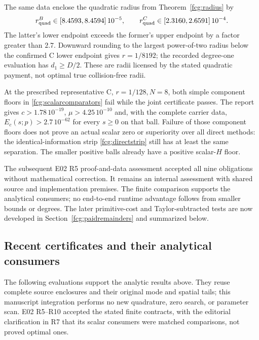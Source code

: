 \documentclass[11pt]{article}
\numberwithin{equation}{section}
\begin{document}
The same data enclose the quadratic radius from
Theorem~\ref{fcg:radius} by
\[
 r_{\rm quad}^{B}\in[8.4593,8.4594]\,10^{-5},\qquad
 r_{\rm quad}^{C}\in[2.3160,2.6591]\,10^{-4}.
\]
The latter's lower endpoint exceeds the former's upper endpoint by
a factor greater than $2.7$. Downward rounding to the largest
power-of-two radius below the confirmed C lower endpoint gives
$r=1/8192$; the recorded degree-one evaluation has $d_1\ge D/2$.
These are radii licensed by the stated quadratic payment, not optimal
true collision-free radii.

At the prescribed representative C, $r=1/128,N=8$, both simple
component floors in \eqref{fcg:scalarcomparators} fail while the joint
certificate passes. The report gives $c>1.78\,10^{-19}$,
$\mu>4.25\,10^{-10}$ and, with the complete carrier data,
$E_c(s;p)>2.7\,10^{-62}$ for every $s\ge0$ on that ball.
Failure of those component floors does not prove an actual scalar
zero or superiority over all direct methods: the identical-information
strip \eqref{fcg:directstrip} still has at least the same separation.
The smaller positive balls already have a positive scalar-$H$ floor.

The subsequent E02 R5 proof-and-data assessment accepted all nine
obligations without mathematical correction. It remains an internal
assessment with shared source and implementation premises. The
finite comparison supports the analytical consumers; no end-to-end
runtime advantage follows from smaller bounds or degrees. The later
primitive-cost and Taylor-subtracted tests are now developed in
Section~\ref{fcg:paidremainders} and summarized below.

\subsection{Recent certificates and their analytical consumers}
\label{app:recentcertificates}

The following evaluations support the analytic results above. They
reuse complete source enclosures and their original mode and spatial
tails; this manuscript integration performs no new quadrature, zero
search, or parameter scan. E02 R5--R10 accepted the stated finite
contracts, with the editorial clarification in R7 that its scalar
consumers were matched comparisons, not proved optimal ones.
\end{document}
